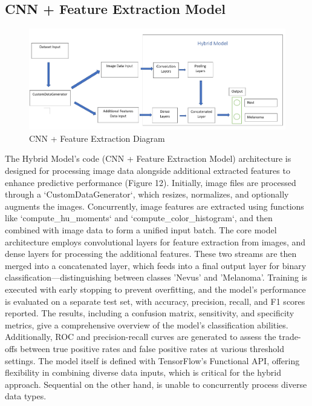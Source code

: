 \documentclass[10pt,twocolumn]{article}
\begin{document}
\subsection{CNN + Feature Extraction Model}
\begin{figure}[h]
\caption{CNN + Feature Extraction Diagram}
\includegraphics[scale=0.4]{Hybrid Model Architecture.png}\newline
\end{figure}
The Hybrid Model's code (CNN + Feature Extraction Model) architecture is designed for processing image data alongside additional extracted features to enhance predictive performance (Figure 12). Initially, image files are processed through a `CustomDataGenerator`, which resizes, normalizes, and optionally augments the images. Concurrently, image features are extracted using functions like `compute\_hu\_moments` and `compute\_color\_histogram`, and then combined with image data to form a unified input batch. The core model architecture employs convolutional layers for feature extraction from images, and dense layers for processing the additional features. These two streams are then merged into a concatenated layer, which feeds into a final output layer for binary classification—distinguishing between classes 'Nevus' and 'Melanoma'.
\newline
Training is executed with early stopping to prevent overfitting, and the model's performance is evaluated on a separate test set, with accuracy, precision, recall, and F1 scores reported. The results, including a confusion matrix, sensitivity, and specificity metrics, give a comprehensive overview of the model's classification abilities. Additionally, ROC and precision-recall curves are generated to assess the trade-offs between true positive rates and false positive rates at various threshold settings.
\newline
The model itself is defined with TensorFlow's Functional API, offering flexibility in combining diverse data inputs, which is critical for the hybrid approach. Sequential on the other hand, is unable to concurrently process diverse data types. 


\printbibliography
\end{document}
